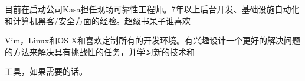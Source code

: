 

\begin{cvparagraph}

目前在启动公司Kasa担任现场可靠性工程师。7年以上后台开发、基础设施自动化和计算机黑客/安全方面的经验。超级书呆子谁喜欢

Vim，Linux和OS X和喜欢定制所有的开发环境。有兴趣设计一个更好的解决问题的方法来解决具有挑战性的任务，并学习新的技术和

工具，如果需要的话。
\end{cvparagraph}
